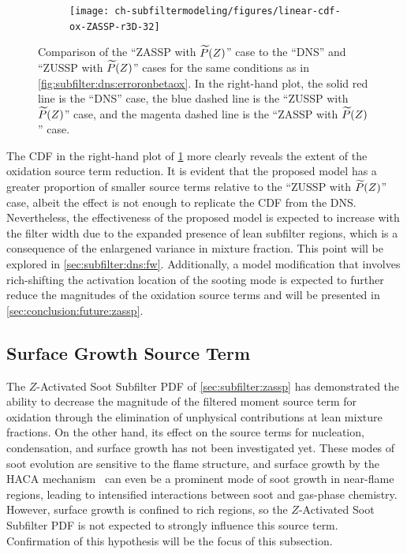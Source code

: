\begin{figure}[ht]
\begin{subfigure}[b]{0.33\linewidth}
  \end{subfigure}%
  \begin{subfigure}[b]{0.33\linewidth}
    \centering
    \texttt{[image: ch-subfiltermodeling/figures/linear-cdf-ox-ZASSP-r3D-32]}
  \end{subfigure}
  \caption[Comparison of ZASSP with $\pz$ to DNS \& ZUSSP with $\pz$ for $\mean{\dot{M}}_{1,0}^{ox}$]{Comparison of the ``ZASSP with $\pz$'' case to the ``DNS'' and ``ZUSSP with $\pz$'' cases for the same conditions as in \cref{fig:subfilter:dns:erroronbetaox}. In the right-hand plot, the solid red line is the ``DNS'' case, the blue dashed line is the ``ZUSSP with $\pz$'' case, and the magenta dashed line is the ``ZASSP with $\pz$'' case.}
  \label{fig:subfilter:dns:zasspcomparisonox}
\end{figure}

The CDF in the right-hand plot of \cref{fig:subfilter:dns:zasspcomparisonox} more clearly reveals the extent of the oxidation source term reduction. It is evident that the proposed model has a greater proportion of smaller source terms relative to the ``ZUSSP with $\pz$'' case, albeit the effect is not enough to replicate the CDF from the DNS. Nevertheless, the effectiveness of the proposed model is expected to increase with the filter width due to the expanded presence of lean subfilter regions, which is a consequence of the enlargened variance in mixture fraction. This point will be explored in \cref{sec:subfilter:dns:fw}. Additionally, a model modification that involves rich-shifting the activation location of the sooting mode is expected to further reduce the magnitudes of the oxidation source terms and will be presented in \cref{sec:conclusion:future:zassp}.


\subsection{Surface Growth Source Term}
\label{sec:subfilter:dns:sg}

The $Z$-Activated Soot Subfilter PDF of \cref{sec:subfilter:zassp} has demonstrated the ability to decrease the magnitude of the filtered moment source term for oxidation through the elimination of unphysical contributions at lean mixture fractions. On the other hand, its effect on the source terms for nucleation, condensation, and surface growth has not been investigated yet. These modes of soot evolution are sensitive to the flame structure, and surface growth by the HACA mechanism~\cite{frenklach1985,frenklach1991} can even be a prominent mode of soot growth in near-flame regions, leading to intensified interactions between soot and gas-phase chemistry. However, surface growth is confined to rich regions, so the $Z$-Activated Soot Subfilter PDF is not expected to strongly influence this source term. Confirmation of this hypothesis will be the focus of this subsection.

